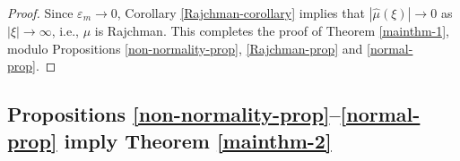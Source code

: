 \documentclass[12pt, twoside]{article}
\theoremstyle{definition}
\numberwithin{equation}{section}
\begin{document}
\begin{proof}
Since $\varepsilon_m \rightarrow 0$, Corollary \ref{Rajchman-corollary} implies that $|\widehat{\mu}(\xi)| \rightarrow 0$ as $|\xi| \rightarrow \infty$, i.e., $\mu$ is Rajchman.  This completes the proof of Theorem \ref{mainthm-1}, modulo Propositions \ref{non-normality-prop}, \ref{Rajchman-prop} and \ref{normal-prop}.
 \end{proof} 
 \subsection{Propositions \ref{non-normality-prop}--\ref{normal-prop} imply Theorem \ref{mainthm-2}}  \label{mainthm-2-proof-section}
\end{document}
